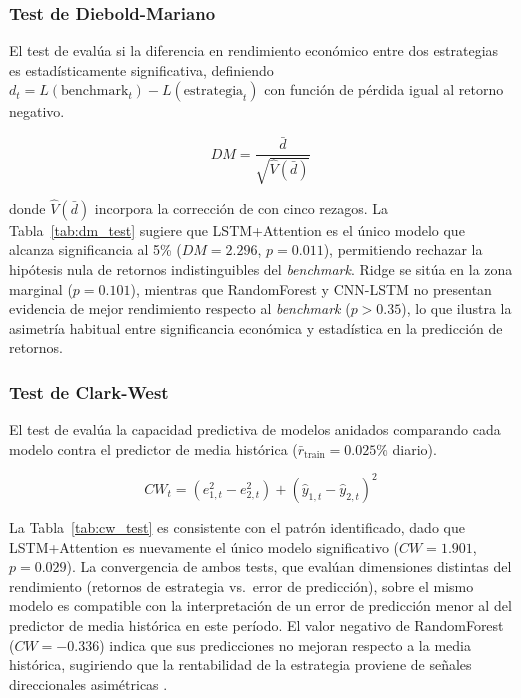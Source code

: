\subsubsection{Test de Diebold-Mariano}
\label{subsec:diebold_mariano}

El test de \citet{diebold1995} eval\'ua si la diferencia en rendimiento econ\'omico entre dos estrategias es estad\'isticamente significativa, definiendo $d_t = L(\text{benchmark}_t) - L(\text{estrategia}_t)$ con funci\'on de p\'erdida igual al retorno negativo.

\begin{equation}
DM = \frac{\bar{d}}{\sqrt{\hat{V}(\bar{d})}}
\label{eq:dm_test}
\end{equation}

donde $\hat{V}(\bar{d})$ incorpora la correcci\'on de \citet{newey1987} con cinco rezagos. La Tabla~\ref{tab:dm_test} sugiere que LSTM+Attention es el \'unico modelo que alcanza significancia al 5\% ($DM = 2.296$, $p = 0.011$), permitiendo rechazar la hip\'otesis nula de retornos indistinguibles del \textit{benchmark}. Ridge se sit\'ua en la zona marginal ($p = 0.101$), mientras que RandomForest y CNN-LSTM no presentan evidencia de mejor rendimiento respecto al \textit{benchmark} ($p > 0.35$), lo que ilustra la asimetr\'ia habitual entre significancia econ\'omica y estad\'istica en la predicci\'on de retornos.

\subsubsection{Test de Clark-West}
\label{subsec:clark_west}

El test de \citet{clark2007approximately} eval\'ua la capacidad predictiva de modelos anidados comparando cada modelo contra el predictor de media hist\'orica ($\bar{r}_{\text{train}} = 0.025\%$ diario).

\begin{equation}
CW_t = (e_{1,t}^2 - e_{2,t}^2) + (\hat{y}_{1,t} - \hat{y}_{2,t})^2
\label{eq:cw_test}
\end{equation}

La Tabla~\ref{tab:cw_test} es consistente con el patr\'on identificado, dado que LSTM+Attention es nuevamente el \'unico modelo significativo ($CW = 1.901$, $p = 0.029$). La convergencia de ambos tests, que eval\'uan dimensiones distintas del rendimiento (retornos de estrategia vs.\ error de predicci\'on), sobre el mismo modelo es compatible con la interpretaci\'on de un error de predicci\'on menor al del predictor de media hist\'orica en este per\'iodo. El valor negativo de RandomForest ($CW = -0.336$) indica que sus predicciones no mejoran respecto a la media hist\'orica, sugiriendo que la rentabilidad de la estrategia proviene de se\~nales direccionales asim\'etricas \citep{pesaran2002}.

